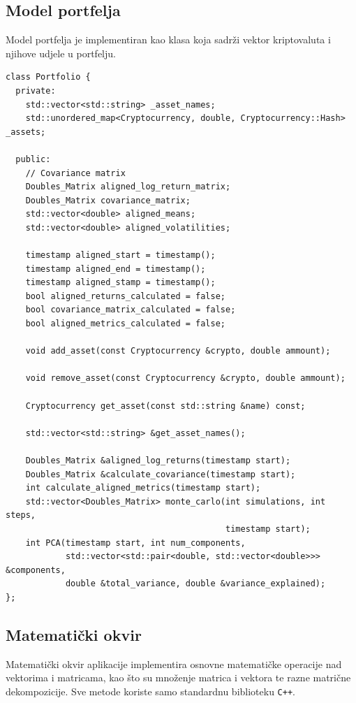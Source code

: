 \documentclass[zavrsnirad]{fer}
\begin{document}
\subsection{Model portfelja}
\label{sek:model_portfelja}
Model portfelja je implementiran kao klasa koja
sadrži vektor kriptovaluta i njihove udjele u portfelju.
\begin{lstlisting}[caption={Model portfelja}, label={lst:portfelj}]
class Portfolio {
  private:
    std::vector<std::string> _asset_names;
    std::unordered_map<Cryptocurrency, double, Cryptocurrency::Hash> _assets;

  public:
    // Covariance matrix
    Doubles_Matrix aligned_log_return_matrix;
    Doubles_Matrix covariance_matrix;
    std::vector<double> aligned_means;
    std::vector<double> aligned_volatilities;

    timestamp aligned_start = timestamp();
    timestamp aligned_end = timestamp();
    timestamp aligned_stamp = timestamp();
    bool aligned_returns_calculated = false;
    bool covariance_matrix_calculated = false;
    bool aligned_metrics_calculated = false;

    void add_asset(const Cryptocurrency &crypto, double ammount);

    void remove_asset(const Cryptocurrency &crypto, double ammount);

    Cryptocurrency get_asset(const std::string &name) const;

    std::vector<std::string> &get_asset_names();

    Doubles_Matrix &aligned_log_returns(timestamp start);
    Doubles_Matrix &calculate_covariance(timestamp start);
    int calculate_aligned_metrics(timestamp start);
    std::vector<Doubles_Matrix> monte_carlo(int simulations, int steps,
                                            timestamp start);
    int PCA(timestamp start, int num_components,
            std::vector<std::pair<double, std::vector<double>>> &components,
            double &total_variance, double &variance_explained);
};
\end{lstlisting}

\subsection{Matematički okvir}
\label{sek:matematicki_okvir}
Matematički okvir aplikacije implementira osnovne matematičke
operacije nad vektorima i matricama, kao što su množenje
matrica i vektora te razne matrične dekompozicije. Sve metode koriste
samo standardnu biblioteku \texttt{C++}.
\end{document}
